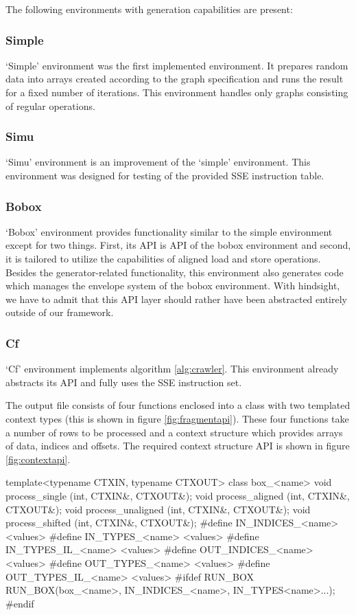 The following environments with generation capabilities are present:

\subsubsection{Simple}
`Simple' environment was the first implemented environment. It prepares random data into arrays created according to the graph specification and runs the result for a fixed number of iterations. This environment handles only graphs consisting of regular operations.

\subsubsection{Simu}
`Simu' environment is an improvement of the `simple' environment. This environment was designed for testing of the provided SSE instruction table.

\subsubsection{Bobox}
`Bobox' environment provides functionality similar to the simple environment except for two things. First, its API is API of the bobox environment and second, it is tailored to utilize the capabilities of aligned load and store operations. Besides the generator-related functionality, this environment also generates code which manages the envelope system of the bobox environment. With hindsight, we have to admit that this API layer should rather have been abstracted entirely outside of our framework. 

  \subsubsection{Cf}
  `Cf' environment implements algorithm \ref{alg:crawler}. This environment already abstracts its API and fully uses the SSE instruction set.
    
    The output file consists of four functions enclosed into a class with two templated context types (this is shown in figure \ref{fig:fragmentapi}). These four functions take a number of rows to be processed and a context structure which provides arrays of data, indices and offsets. The required context structure API is shown in figure \ref{fig:contextapi}. 

\mybeginfig
\begin{code}
template<typename CTXIN, typename CTXOUT>
class box_<name>
{
  void process_single    (int, CTXIN&, CTXOUT&);
  void process_aligned   (int, CTXIN&, CTXOUT&);
  void process_unaligned (int, CTXIN&, CTXOUT&);
  void process_shifted   (int, CTXIN&, CTXOUT&);
}
#define IN_INDICES_<name> <values>
#define IN_TYPES_<name> <values>
#define IN_TYPES_IL_<name> <values>
#define OUT_INDICES_<name> <values>
#define OUT_TYPES_<name> <values>
#define OUT_TYPES_IL_<name> <values>
#ifdef RUN_BOX
  RUN_BOX(box_<name>, IN_INDICES_<name>, IN_TYPES<name>...);
#endif

\end{code}



